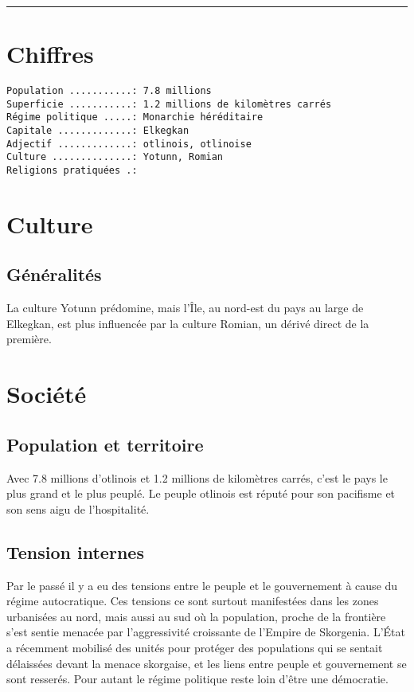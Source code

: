 \documentclass[french, a4paper, 12pt]{article}
\begin{document}
 \maketitle \vspace{3pt} \hrule \vspace{3pt}

\section{Chiffres}

\begin{verbatim}
Population ...........: 7.8 millions
Superficie ...........: 1.2 millions de kilomètres carrés
Régime politique .....: Monarchie héréditaire
Capitale .............: Elkegkan
Adjectif .............: otlinois, otlinoise
Culture ..............: Yotunn, Romian
Religions pratiquées .:
\end{verbatim}

\section{Culture}

\subsection{Généralités}

La culture Yotunn prédomine, mais l'Île, au nord-est du pays au large de Elkegkan, est plus influencée par la culture Romian, un dérivé direct de la première.

\section{Société}

\subsection{Population et territoire}

Avec 7.8 millions d'otlinois et 1.2 millions de kilomètres carrés, c'est le pays le plus grand et le plus peuplé. Le peuple otlinois est réputé pour son pacifisme et son sens aigu de l'hospitalité.

\subsection{Tension internes}

Par le passé il y a eu des tensions entre le peuple et le gouvernement à cause du régime autocratique. Ces tensions ce sont surtout manifestées dans les zones urbanisées au nord, mais aussi au sud où la population, proche de la frontière s'est sentie menacée par l'aggressivité croissante de l'Empire de Skorgenia. L'État a récemment mobilisé des unités pour protéger des populations qui se sentait délaissées devant la menace skorgaise, et les liens entre peuple et gouvernement se sont resserés. Pour autant le régime politique reste loin d'être une démocratie.
\end{document}
